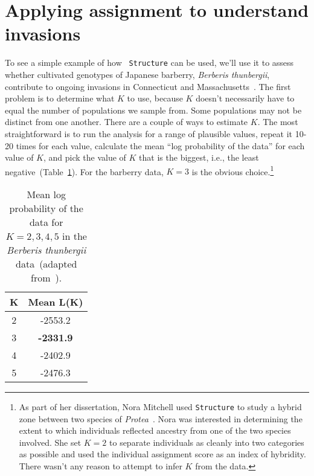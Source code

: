 \documentclass[12pt]{article}
\begin{document}
\section*{Applying assignment to understand invasions}

To see a simple example of how {\tt
  Structure} can be used, we'll
use it to assess whether cultivated genotypes of Japanese barberry,
{\it Berberis
  thunbergii\/},
contribute to ongoing invasions in Connecticut and
Massachusetts~\cite{Lubell-etal-2008}. The first problem is to determine what $K$
to use, because $K$ doesn't necessarily have to equal the number of
populations we sample from. Some populations may not be distinct from
one another. There are a couple of ways to estimate $K$. The most
straightforward is to run the analysis for a range of plausible
values, repeat it 10-20 times for each value, calculate the mean ``log
probability of the data'' for each value of $K$, and pick the value of
$K$ that is the biggest, i.e., the least
negative~(Table~\ref{table:berberis-k}). For the barberry data, $K=3$
is the obvious choice.\footnote{As part of her dissertation, Nora
  Mitchell used {\tt Structure} to study a hybrid zone between two
  species of {\it Protea}~\cite{Mitchell-Holsinger-2018}. Nora was
  interested in determining the extent to which individuals reflected
  ancestry from one of the two species involved. She set $K=2$ to
  separate individuals as cleanly into two categories as possible and
  used the individual assignment score as an index of hybridity. There
  wasn't any reason to attempt to infer $K$ from the data.}

\begin{table}
\begin{center}
\begin{tabular}{cc}
\hline\hline
K & Mean L(K) \\
\hline
2 & -2553.2 \\
3 & {\bf -2331.9} \\
4 & -2402.9 \\
5 & -2476.3 \\
\hline
\end{tabular}
\end{center}
\caption{Mean log probability of the data for $K=2,3,4,5$ in the {\it
    Berberis thunbergii\/} data~(adapted
  from~\cite{Lubell-etal-2008}).}\label{table:berberis-k}
\end{table}
\end{document}
